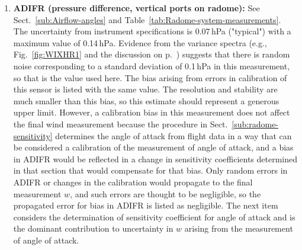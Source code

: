 \documentclass[12pt,twoside,english]{article}\usepackage[]{graphicx}\usepackage[]{color}
\let\OrgIndex\index
\renewcommand*{\index}[1]{\OrgIndex{#1}}
\begin{document}
{{\begin{enumerate}
\item \textbf{ADIFR (pressure difference, vertical ports on radome): }See Sect.~\ref{sub:Airflow-angles} and Table~\ref{tab:Radome-system-measurements}. The uncertainty from instrument specifications is 0.07\,hPa ("typical") with a maximum value of 0.14\,hPa. Evidence from the variance spectra (e.g., Fig.~\ref{fig:WIXHR1} and the discussion on p.~\pageref{page:ADIFRnoise}) suggests that there is random noise corresponding to a standard deviation of 0.1\,hPa in this measurement, so that is the value used here. The bias arising from errors in calibration of this sensor is listed with the same value. The resolution and stability are much smaller than this bias, so this estimate should represent a generous upper limit. However, a calibration bias in this measurement does not affect the final wind measurement because the procedure in Sect.~\ref{sub:radome-sensitivity} determines the angle of attack from flight data in a way that can be considered a calibration of the measurement of angle of attack, and a bias in ADIFR would be reflected in a change in sensitivity coefficients determined in that section that would compensate for that bias. Only random errors in ADIFR or changes in the calibration would propagate to the final measurement $w$, and such errors are thought to be negligible, so the propagated error for bias in ADIFR is listed as negligible. The next item considers the determination of sensitivity coefficient for angle of attack and is the dominant contribution to uncertainty in $w$ arising from the measurement of angle of attack.  

\end{enumerate}}}
\end{document}
